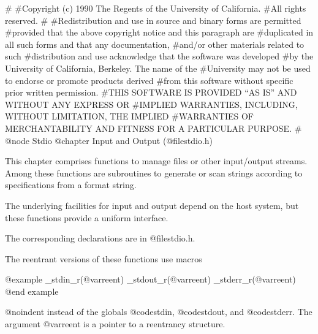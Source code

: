 #
#Copyright (c) 1990 The Regents of the University of California.
#All rights reserved.
#
#Redistribution and use in source and binary forms are permitted
#provided that the above copyright notice and this paragraph are
#duplicated in all such forms and that any documentation,
#and/or other materials related to such
#distribution and use acknowledge that the software was developed
#by the University of California, Berkeley.  The name of the
#University may not be used to endorse or promote products derived
#from this software without specific prior written permission.
#THIS SOFTWARE IS PROVIDED ``AS IS'' AND WITHOUT ANY EXPRESS OR
#IMPLIED WARRANTIES, INCLUDING, WITHOUT LIMITATION, THE IMPLIED
#WARRANTIES OF MERCHANTABILITY AND FITNESS FOR A PARTICULAR PURPOSE.
#
@node Stdio
@chapter Input and Output (@file{stdio.h})

This chapter comprises functions to manage files
or other input/output streams. Among these functions are subroutines
to generate or scan strings according to specifications from a format string.

The underlying facilities for input and output depend on the host
system, but these functions provide a uniform interface.

The corresponding declarations are in @file{stdio.h}.

The reentrant versions of these functions use macros

@example
_stdin_r(@var{reent})
_stdout_r(@var{reent})
_stderr_r(@var{reent})
@end example

@noindent
instead of the globals @code{stdin}, @code{stdout}, and
@code{stderr}.  The argument @var{reent} is a pointer to a reentrancy
structure.

